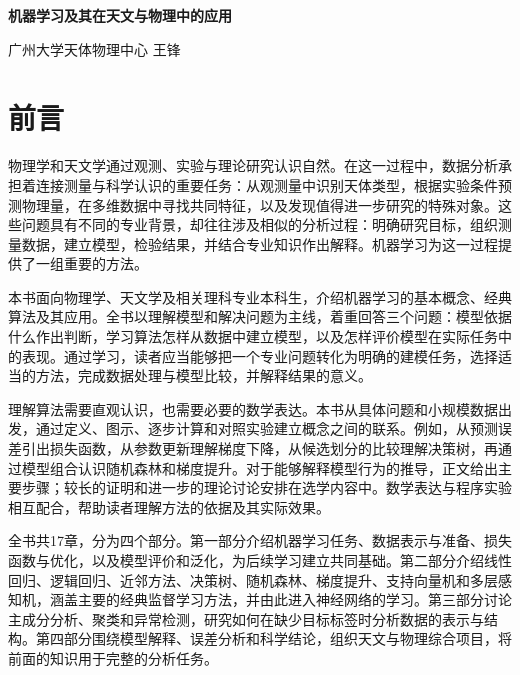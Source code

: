 \documentclass[UTF8,openany,11pt,a4paper]{ctexbook}
\begin{document}
\frontmatter
\begin{titlepage}
\centering\vspace*{4cm}
{\sffamily\bfseries\Huge 机器学习及其在天文与物理中的应用\par}
\vspace{1.1cm}{\Large 面向非计算机专业本科生的概念、经典算法与实践\par}
\vspace{3cm}{\large 概念与案例教学修订版\par}
\vspace{1cm}{\large 2026年11月\par}
\vfill{\small 广州大学天体物理中心 王锋\par}
\end{titlepage}
\chapter*{前言}

物理学和天文学通过观测、实验与理论研究认识自然。在这一过程中，数据分析承担着连接测量与科学认识的重要任务：从观测量中识别天体类型，根据实验条件预测物理量，在多维数据中寻找共同特征，以及发现值得进一步研究的特殊对象。这些问题具有不同的专业背景，却往往涉及相似的分析过程：明确研究目标，组织测量数据，建立模型，检验结果，并结合专业知识作出解释。机器学习为这一过程提供了一组重要的方法。

本书面向物理学、天文学及相关理科专业本科生，介绍机器学习的基本概念、经典算法及其应用。全书以理解模型和解决问题为主线，着重回答三个问题：模型依据什么作出判断，学习算法怎样从数据中建立模型，以及怎样评价模型在实际任务中的表现。通过学习，读者应当能够把一个专业问题转化为明确的建模任务，选择适当的方法，完成数据处理与模型比较，并解释结果的意义。

理解算法需要直观认识，也需要必要的数学表达。本书从具体问题和小规模数据出发，通过定义、图示、逐步计算和对照实验建立概念之间的联系。例如，从预测误差引出损失函数，从参数更新理解梯度下降，从候选划分的比较理解决策树，再通过模型组合认识随机森林和梯度提升。对于能够解释模型行为的推导，正文给出主要步骤；较长的证明和进一步的理论讨论安排在选学内容中。数学表达与程序实验相互配合，帮助读者理解方法的依据及其实际效果。

全书共17章，分为四个部分。第一部分介绍机器学习任务、数据表示与准备、损失函数与优化，以及模型评价和泛化，为后续学习建立共同基础。第二部分介绍线性回归、逻辑回归、近邻方法、决策树、随机森林、梯度提升、支持向量机和多层感知机，涵盖主要的经典监督学习方法，并由此进入神经网络的学习。第三部分讨论主成分分析、聚类和异常检测，研究如何在缺少目标标签时分析数据的表示与结构。第四部分围绕模型解释、误差分析和科学结论，组织天文与物理综合项目，将前面的知识用于完整的分析任务。
\end{document}
